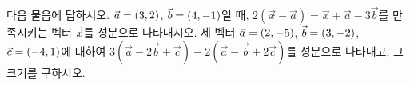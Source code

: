 다음 물음에 답하시오.
 $\vec{a}=(3{,}\mkern3mu\mathopen{}2)$, $\vec{b}=(4{,}\mkern3mu\mathopen{}-1)$일 때, $2(\vec{x}-\vec{a})=\vec{x}+\vec{a}-3\vec{b}$를 만족시키는 벡터 $\vec{x}$를 성분으로 나타내시오.
 세 벡터 $\vec{a}=(2{,}\mkern3mu\mathopen{}-5)$, $\vec{b}=(3{,}\mkern3mu\mathopen{}-2)$, $\vec{c}=(-4{,}\mkern3mu\mathopen{}1)$에 대하여 $3(\vec{a}-2\vec{b}+\vec{c})-2(\vec{a}-\vec{b}+2\vec{c})$를 성분으로 나타내고, 그 크기를 구하시오.
